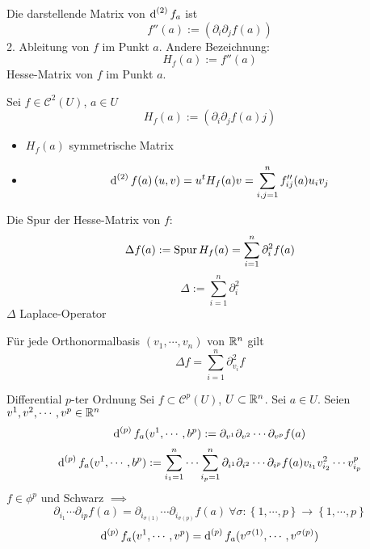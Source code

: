 \begin{Bem}
  Die darstellende Matrix von $\operatorname{d}^{(2)}f_a$ ist
  \[f''(a):=\left( \partial_i\partial_jf(a) \right)\]
  2. Ableitung von $f$ im Punkt $a$. Andere Bezeichnung:
  \[H_f(a):=f''(a)\]
  Hesse-Matrix von $f$ im Punkt $a$.
\end{Bem}
\begin{Bem}
  Sei $f\in\mathcal{C}^2(U)$, $a\in U$
  \[H_f(a):=\left( \partial_i\partial_jf(a)j \right)\]
  \begin{itemize}
    \item $H_f(a)$ symmetrische Matrix
    \item \[\operatorname{d}^{(2)}f(a)\left( u,v \right)=u^tH_f(a)v=\sum_{i,j=1}^nf_{ij}''(a)u_iv_j\]
  \end{itemize}
\end{Bem}
\begin{Bem}
  Die Spur der Hesse-Matrix von $f$:
  \[\Delta f(a):=\operatorname{Spur} H_f(a)=\sum_{i=1}^n\partial^2_if(a)\]
  \[\Delta:=\sum^n_{i=1}\partial^2_i\]
  $\Delta$ Laplace-Operator
\end{Bem}
\begin{Lem}
  Für jede Orthonormalbasis $\left( v_1,\cdots,v_n \right)$ von $\mathbb{R}^n$ gilt
  \[\Delta f=\sum^n_{i=1}\partial_{v_i}^2f\]
\end{Lem}
\begin{Def}{Differential $p$-ter Ordnung}
  Sei $f\subset\mathcal{C}^p(U)$, $U\subset \mathbb{R}^n$. Sei $a\in U$. Seien $v^1,v^2,\cdots,v^p\in\mathbb{R}^n$
  \[\operatorname{d}^{(p)}f_a(v^1,\cdots,b^p):=\partial_{v^1}\partial_{v^2}\cdots\partial_{v^p}f(a)\]
  \[\operatorname{d}^{(p)}f_a(v^1,\cdots,b^p):=\sum^n_{i_1=1}\cdots\sum^n_{i_p=1}\partial_{i^1}\partial_{i^2}\cdots\partial_{i^p}f(a)v_{i_1}v_{i_2}^2\cdots v_{i_p}^p\]
  $f\in \phi^p$ und Schwarz $\implies$
  \[\partial_{i_1}\cdots\partial_{ip}f(a)=\partial_{i_{\sigma(1)}}\cdots\partial_{i_{\sigma(p)}}f(a)\ \forall \sigma:\left\{ 1,\cdots,p \right\}\to\left\{ 1,\cdots,p \right\}\]
  \[\operatorname{d}^{(p)}f_a(v^1,\cdots,v^p)=\operatorname{d}^{(p)}f_a(v^{\sigma(1)},\cdots,v^{\sigma(p)})\]
\end{Def}
